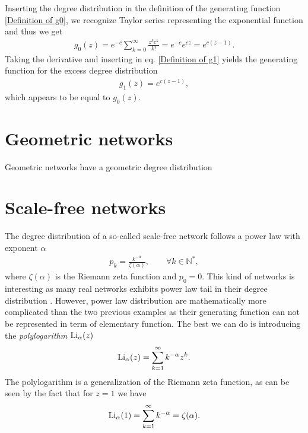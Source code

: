 \documentclass[
11pt, %
english, %
singlespacing, %
nolistspacing, %
liststotoc, %
headsepline, %
]{MastersDoctoralThesis} %
\begin{document}
Inserting the degree distribution in the definition of the generating function \eqref{Definition of g0}, we recognize Taylor series representing the exponential function and thus we get
\begin{align}
	g_0(z) = e^{-c} \sum_{k = 0}^\infty \frac{z^k c^k}{k!} = e^{-c} e^{c z} = e^{c(z - 1)}. \label{g0 for ER networks}
\end{align}
Taking the derivative and inserting in eq. \eqref{Definition of g1} yields the generating function for the excess degree distribution
\begin{align} 
	g_1(z) = e^{c(z - 1)},
\end{align}
which appears to be equal to $g_0(z)$.

\section{Geometric networks}

Geometric networks have a geometric degree distribution

\section{Scale-free networks}

The degree distribution of a so-called scale-free network follows a power law with exponent $\alpha$
\begin{align}
	p_k = \frac{k^{-\alpha}}{\zeta(\alpha)}, \qquad \forall k \in \mathbb{N}^*, \label{Power law degree distribution}
\end{align}
where $\zeta(\alpha)$ is the Riemann zeta function and $p_0 = 0$. This kind of networks is interesting as many real networks exhibits power law tail in their degree distribution . However, power law distribution are mathematically more complicated than the two previous examples as their generating function can not be represented in term of elementary function. The best we can do is introducing the \emph{polylogarithm} $\mathrm{Li}_{\alpha}\!\left(z\right)$
\begin{align}
	\mathrm{Li}_{\alpha}\!\left(z\right) = \sum_{k=1}^\infty k^{-\alpha} z^k. \label{Definition of polylogarithm}
\end{align}
The polylogarithm is a generalization of the Riemann zeta function, as can be seen by the fact that for $z = 1$ we have
\begin{align}
	\mathrm{Li}_{\alpha}\!\left(1\right) = \sum_{k=1}^\infty k^{-\alpha} = \zeta(\alpha) \label{Polylogarithm of 1}.
\end{align}
\end{document}
